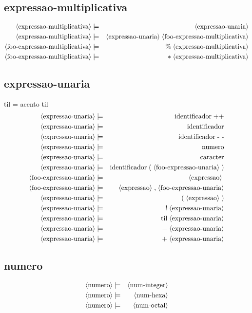 \documentclass[12pt,a4papper]{article}
\newcommand{\pn}[1]{\langle \textnormal{#1} \rangle}
\newcommand{\pp}{\models}
\newcommand{\ww}{\;}
\newcommand{\sm}[1]{\textnormal{#1}}
\begin{document}
\begin{landscape}
\subsection{expressao-multiplicativa}
\begin{eqnarray}
        \pn{expressao-multiplicativa} &\pp& \pn{expressao-unaria} \\
        \pn{expressao-multiplicativa} &\pp& \pn{expressao-unaria} \ww \pn{foo-expressao-multiplicativa} \\
    \pn{foo-expressao-multiplicativa} &\pp& \sm{\%} \ww \pn{expressao-multiplicativa} \\
        \pn{foo-expressao-multiplicativa} &\pp& \sm{$*$} \ww \pn{expressao-multiplicativa}
\end{eqnarray}



\subsection{expressao-unaria}
til = acento til
\begin{eqnarray}
        \pn{expressao-unaria} &\pp& \sm{identificador}  \ww  \sm{++} \\
        \pn{expressao-unaria} &\pp& \sm{identificador} \\
        \pn{expressao-unaria} &\pp& \sm{identificador}  \ww  \sm{- -} \\
        \pn{expressao-unaria} &\pp& \sm{numero} \\
        \pn{expressao-unaria} &\pp& \sm{caracter} \\
        \pn{expressao-unaria} &\pp& \sm{identificador} \ww \sm{(} \ww \pn{foo-expressao-unaria} \ww \sm{)} \\
   \pn{foo-expressao-unaria}  &\pp& \pn{expressao} \ww \\
   \pn{foo-expressao-unaria}  &\pp& \pn{expressao} \ww \sm{,} \ww \pn{foo-expressao-unaria} \\
       \pn{expressao-unaria}  &\pp& \sm{(}  \ww   \pn{expressao}   \ww  \sm{)} \\
       \pn{expressao-unaria}  &\pp& \sm{!}  \ww  \pn{expressao-unaria} \\
       \pn{expressao-unaria}  &\pp& \sm{til}  \ww  \pn{expressao-unaria} \\
       \pn{expressao-unaria}  &\pp& \sm{$-$}  \ww  \pn{expressao-unaria} \\
       \pn{expressao-unaria}  &\pp& \sm{$+$}  \ww  \pn{expressao-unaria} 
      \end{eqnarray}


\subsection{numero}
\begin{eqnarray}
        \pn{numero} &\pp& \pn{num-integer} \\
        \pn{numero} &\pp& \pn{num-hexa} \\
        \pn{numero} &\pp& \pn{num-octal} 
\end{eqnarray}

\end{landscape}
\end{document}

